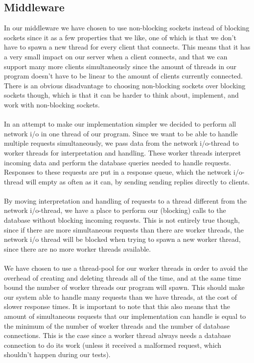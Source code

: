 \documentclass{article}
\begin{document}
        \subsection{Middleware}
            \label{sec:description_middleware}
            In our middleware we have chosen to use non-blocking sockets instead of blocking sockets since it as a few properties that we like, one of which is that we don't have to spawn a new thread for every client that connects. This means that it has a very small impact on our server when a client connects, and that we can support many more clients simultaneously since the amount of threads in our program doesn't have to be linear to the amount of clients currently connected. There is an obvious disadvantage to choosing non-blocking sockets over blocking sockets though, which is that it can be harder to think about, implement, and work with non-blocking sockets.\\
            \\
            In an attempt to make our implementation simpler we decided to perform all network i/o in one thread of our program. Since we want to be able to handle multiple requests simultaneously, we pass data from the network i/o-thread to worker threads for interpretation and handling. These worker threads interpret incoming data and perform the database queries needed to handle requests. Responses to these requests are put in a response queue, which the network i/o-thread will empty as often as it can, by sending sending replies directly to clients.\\
            \\
            By moving interpretation and handling of requests to a thread different from the network i/o-thread, we have a place to perform our (blocking) calls to the database without blocking incoming requests. This is not entirely true though, since if there are more simultaneous requests than there are worker threads, the network i/o thread will be blocked when trying to spawn a new worker thread, since there are no more worker threads available.\\
            \\
            We have chosen to use a thread-pool for our worker threads in order to avoid the overhead of creating and deleting threads all of the time, and at the same time bound the  number of worker threads our program will spawn. This should make our system able to handle many requests than we have threads, at the cost of slower response times. It is important to note that this also means that the amount of simultaneous requests that our implementation can handle is equal to the minimum of the number of worker threads and the number of database connections. This is the case since a worker thread always needs a database connection to do its work (unless it received a malformed request, which shouldn't happen during our tests).\\
\end{document}
